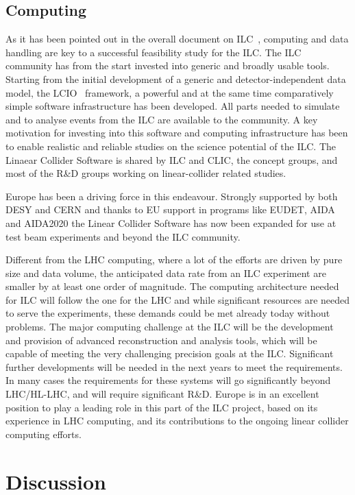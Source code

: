 \documentclass[%
 reprint,
 floatfix,
 amsmath,amssymb,
 aps,
]{revtex4-1}
\begin{document}
\subsection{Computing}
As it has been pointed out in the overall document on ILC~\cite{ILCESU1}, computing and data 
handling are key to a successful feasibility study for the ILC. The ILC community 
has from the start invested into generic and broadly usable tools. Starting from 
the initial development of a generic and detector-independent data model, the 
LCIO~\cite{bib:lcio} framework, a powerful and at the same time comparatively simple software 
infrastructure has been developed. All parts needed to simulate and to analyse 
events from the ILC are available to the community. A key motivation for investing
into this software and computing infrastructure has been to enable realistic and reliable 
studies on the science potential of the ILC. The Linaear Collider Software is shared by ILC and 
CLIC, the concept groups, and most of the R\&D groups working on linear-collider related 
studies. 

Europe has been a driving force in this endeavour. Strongly 
supported by both DESY and CERN and thanks to EU support in programs like EUDET, 
AIDA and AIDA2020 the Linear Collider Software has now been expanded for use at test 
beam experiments and beyond the ILC     community.

Different from the LHC computing, where a lot of the efforts are driven by pure 
size and data volume, the anticipated data rate from an ILC experiment are 
smaller by at least one order of magnitude. The computing architecture needed for 
ILC will follow the one for the LHC and while significant resources are needed 
to serve the experiments, these demands could be met already today without problems. 
The major computing challenge at the ILC will be the development and provision 
of advanced reconstruction and analysis tools, which will be capable of meeting 
the very challenging precision goals at the ILC. Significant further 
developments will be needed in the next years to meet the requirements. 
In many cases the requirements for these systems will go significantly beyond LHC/HL-LHC, 
and will require significant R\&D. Europe is in an excellent position to play a 
leading role in this part of the ILC project, based on its experience in LHC 
computing, and its contributions to the ongoing linear collider computing efforts. 

\section{\label{sec:discussion}Discussion}
\end{document}
